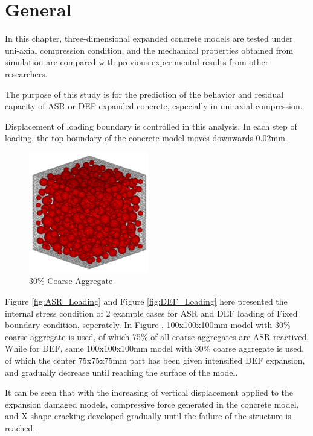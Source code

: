 

\section{General}

In this chapter, three-dimensional expanded concrete models are tested under uni-axial compression condition, and the mechanical properties obtained from simulation are compared with previous experimental results from other researchers.

The purpose of this study is for the prediction of the behavior and residual capacity of ASR or DEF expanded concrete, especially in uni-axial compression.

Displacement of loading boundary is controlled in this analysis. In each step of loading, the top boundary of the concrete model moves downwards 0.02mm.

\begin{figure}[ht]
\centering
\includegraphics[width=.3\linewidth]{Files/Aggregate/A30.png}
  \caption{30\% Coarse Aggregate}
  \label{fig:A30_model}
\end{figure}

Figure \ref{fig:ASR_Loading} and Figure \ref{fig:DEF_Loading} here presented the internal stress condition of 2 example cases for ASR and DEF loading of Fixed boundary condition, seperately. In Figure , 100x100x100mm model with 30\% coarse aggregate is used, of which 75\% of all coarse aggregates are ASR reactived. While for DEF, same 100x100x100mm model with 30\% coarse aggregate is used, of which the center 75x75x75mm part has been given intensified DEF expansion, and gradually decrease until reaching the surface of the model.

It can be seen that with the increasing of vertical displacement applied to the expansion damaged models, compressive force generated in the concrete model,  and X shape cracking developed gradually until the failure of the structure is reached.

